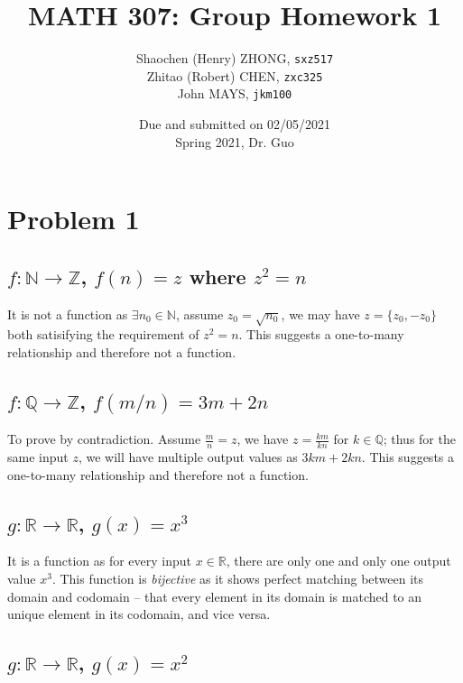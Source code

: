 \documentclass[11pt]{article}
\newcommand{\ilc}{\texttt}
\begin{document}
\title{\textbf{MATH 307: Group Homework 1}}


\author{Shaochen (Henry) ZHONG, \ilc{sxz517} \\
Zhitao (Robert) CHEN, \ilc{zxc325} \\
John MAYS, \ilc{jkm100}}
\date{Due and submitted on 02/05/2021 \\ Spring 2021, Dr. Guo}
\maketitle



\section*{Problem 1}

\subsection*{$f: \mathbb{N} \to \mathbb{Z}$, $f(n) = z$ where $z^2 = n$}

It is not a function as $\exists  n_0 \in \mathbb{N}$, assume $z_0 = \sqrt{n_0}$, we may have $z = \{z_0, -z_0\}$ both satisifying the requirement of $z^2 = n$. This suggests a one-to-many relationship and therefore not a function.


\subsection*{$f: \mathbb{Q} \to \mathbb{Z}$, $f(m/n) = 3m + 2n$}

To prove by contradiction. Assume $\frac{m}{n} = z$, we have $z = \frac{km}{kn}$ for $k \in \mathbb{Q}$; thus for the same input $z$, we will have multiple output values as $3km + 2kn$. This suggests a one-to-many relationship and therefore not a function.

\subsection*{$g: \mathbb{R} \to \mathbb{R}$, $g(x) = x^3$}

It is a function as for every input $x \in \mathbb{R}$, there are only one and only one output value $x^3$. This function is  \textit{bijective} as it shows perfect matching between its domain and codomain -- that every element in its domain is matched to an unique element in its codomain, and vice versa.

\subsection*{$g: \mathbb{R} \to \mathbb{R}$, $g(x) = x^2$}
\end{document}
